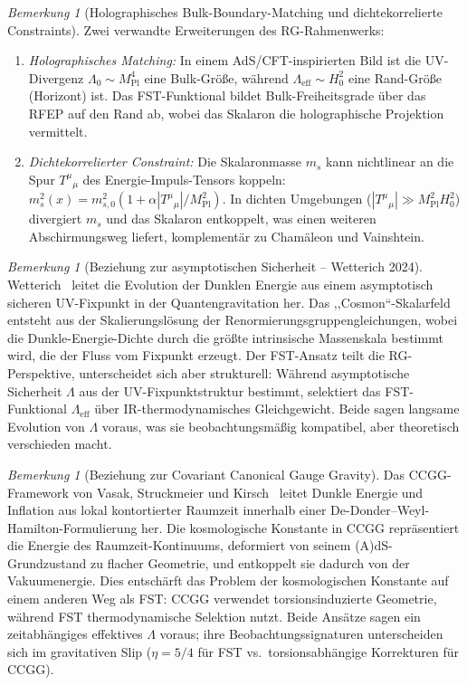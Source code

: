 \documentclass[12pt,a4paper]{article}
\theoremstyle{definition}
\theoremstyle{plain}
\theoremstyle{remark}
\newtheorem{remark}[definition]{Bemerkung}
\begin{document}
\begin{remark}[Holographisches Bulk-Boundary-Matching und dichtekorrelierte Constraints]
\label{rem:holographic-matching}
Zwei verwandte Erweiterungen des RG-Rahmenwerks:
\begin{enumerate}
\item \emph{Holographisches Matching:} In einem AdS/CFT-inspirierten Bild ist die UV-Divergenz $\Lambda_0 \sim M_{\mathrm{Pl}}^4$ eine Bulk-Gr\"o\ss e, w\"ahrend $\Lambda_{\mathrm{eff}} \sim H_0^2$ eine Rand-Gr\"o\ss e (Horizont) ist. Das FST-Funktional bildet Bulk-Freiheitsgrade \"uber das RFEP auf den Rand ab, wobei das Skalaron die holographische Projektion vermittelt.
\item \emph{Dichtekorrelierter Constraint:} Die Skalaronmasse $m_s$ kann nichtlinear an die Spur $T^\mu{}_\mu$ des Energie-Impuls-Tensors koppeln: $m_s^2(x) = m_{s,0}^2 (1 + \alpha |T^\mu{}_\mu| / M_{\mathrm{Pl}}^2)$. In dichten Umgebungen ($|T^\mu{}_\mu| \gg M_{\mathrm{Pl}}^2 H_0^2$) divergiert $m_s$ und das Skalaron entkoppelt, was einen weiteren Abschirmungsweg liefert, komplement\"ar zu Cham\"aleon und Vainshtein.
\end{enumerate}
\end{remark}

\begin{remark}[Beziehung zur asymptotischen Sicherheit -- Wetterich 2024]
\label{rem:asymptotic-safety-wetterich}
Wetterich~\cite{Wetterich2024} leitet die Evolution der Dunklen Energie aus einem asymptotisch sicheren UV-Fixpunkt in der Quantengravitation her. Das ,,Cosmon``-Skalarfeld entsteht aus der Skalierungsl\"osung der Renormierungsgruppengleichungen, wobei die Dunkle-Energie-Dichte durch die gr\"o\ss te intrinsische Massenskala bestimmt wird, die der Fluss vom Fixpunkt erzeugt. Der FST-Ansatz teilt die RG-Perspektive, unterscheidet sich aber strukturell: W\"ahrend asymptotische Sicherheit $\Lambda$ aus der UV-Fixpunktstruktur bestimmt, selektiert das FST-Funktional $\Lambda_{\mathrm{eff}}$ \"uber IR-thermodynamisches Gleichgewicht. Beide sagen langsame Evolution von $\Lambda$ voraus, was sie beobachtungsm\"a\ss ig kompatibel, aber theoretisch verschieden macht.
\end{remark}

\begin{remark}[Beziehung zur Covariant Canonical Gauge Gravity]
\label{rem:ccgg}
Das CCGG-Framework von Vasak, Struckmeier und Kirsch~\cite{VasakCCGG2020} leitet Dunkle Energie und Inflation aus lokal kontortierter Raumzeit innerhalb einer De-Donder--Weyl-Hamilton-Formulierung her. Die kosmologische Konstante in CCGG repr\"asentiert die Energie des Raumzeit-Kontinuums, deformiert von seinem (A)dS-Grundzustand zu flacher Geometrie, und entkoppelt sie dadurch von der Vakuumenergie. Dies entsch\"arft das Problem der kosmologischen Konstante auf einem anderen Weg als FST: CCGG verwendet torsionsinduzierte Geometrie, w\"ahrend FST thermodynamische Selektion nutzt. Beide Ans\"atze sagen ein zeitabh\"angiges effektives $\Lambda$ voraus; ihre Beobachtungssignaturen unterscheiden sich im gravitativen Slip ($\eta = 5/4$ f\"ur FST vs.\ torsionsabh\"angige Korrekturen f\"ur CCGG).
\end{remark}
\end{document}
